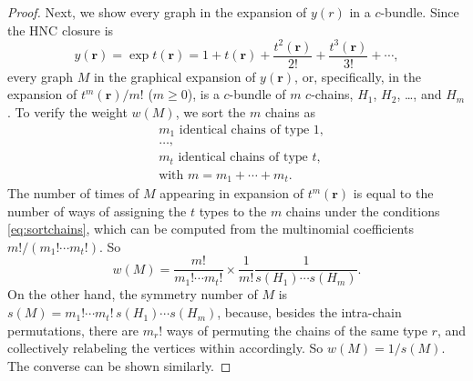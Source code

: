 \documentclass[preprint]{revtex4-1}
\newcommand{\vct}[1]{\mathbf{#1}}
\providecommand{\vr}{} %
\renewcommand{\vr}{\vct{r}}
\begin{document}
\begin{proof}
Next, we show every graph in the expansion of $y(r)$
  in a $c$-bundle.
%
Since the HNC closure is
\[
  y(\vr)
= \exp t(\vr)
=
1 + t(\vr)
+ \frac{ t^2(\vr) }{ 2! }
+ \frac{ t^3(\vr) }{ 3! }+ \cdots,
\]
every graph $M$ in the graphical expansion of $y(\vr)$,
  or, specifically, in the expansion of $t^m(\vr)/m!$ ($m \ge 0$),
  is a $c$-bundle of $m$ $c$-chains,
  $H_1$, $H_2$, \dots, and $H_m$.
%
%
To verify the weight $w(M)$,
  we sort the $m$ chains as
\begin{equation}
\begin{split}
& \text{$m_1$ identical chains of type $1$}, \\
& \dots, \\
& \text{$m_t$ identical chains of type $t$}, \\
& \text{with $m = m_1 + \cdots + m_t$}.
\end{split}\label{eq:sortchains}
\end{equation}
%
The number of times of $M$
  appearing in expansion of $t^m(\vr)$
  is equal to the number of ways
  of assigning the $t$ types to the $m$ chains
  under the conditions \eqref{eq:sortchains},
  which can be computed from the multinomial coefficients
  $m!/(m_1! \cdots m_t!)$.
%
So
%
\[
  w(M)
=
  \frac{ m! } { m_1! \cdots m_t! }
  \times
  \frac{ 1 } { m! }
  \frac{ 1 } { s(H_1) \cdots s(H_m) }.
\]
%
On the other hand,
  the symmetry number of $M$ is
  $s(M) = m_1! \cdots m_t! \, s(H_1) \cdots s(H_m)$,
  because, besides the intra-chain permutations,
  there are $m_r!$ ways of permuting the chains of the same type $r$,
  and collectively relabeling the vertices within accordingly.
So $w(M) = 1/s(M)$.
%
The converse can be shown similarly.


\end{proof}
\end{document}
